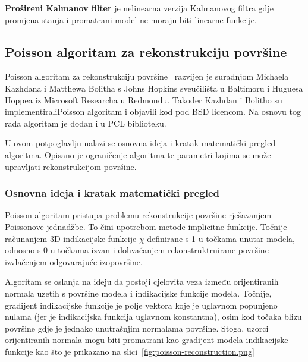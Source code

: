\textbf{Prošireni Kalmanov filter} je nelinearna verzija Kalmanovog
filtra gdje promjena stanja i promatrani model ne moraju biti linearne
funkcije.



\newpage
\subsection{Poisson algoritam za rekonstrukciju površine} %
\label{sub:Poisson}
Poisson algoritam za rekonstrukciju površine~\cite{Kazhdan:2006}
razvijen je suradnjom Michaela Kazhdana i Matthewa Bolitha s Johns
Hopkins sveučilišta u Baltimoru i Huguesa Hoppea iz Microsoft Researcha
u Redmondu. Također Kazhdan i Bolitho su implementirali\footnotemark[1]
Poisson algoritam i objavili kod pod BSD licencom. Na osnovu tog rada
algoritam je dodan i u PCL biblioteku.

U ovom potpoglavlju nalazi se osnovna ideja i kratak matematički pregled
algoritma. Opisano je ograničenje algoritma te parametri kojima se može
upravljati rekonstrukcijom površine.



\subsubsection{Osnovna ideja i kratak matematički pregled} %
\label{ssub:Osnovna ideja i kratak matematički pregled}

Poisson algoritam pristupa problemu rekonstrukcije površine rješavanjem
Poissonove jednadžbe. To čini upotrebom metode implicitne funkcije.
Točnije računanjem 3D indikacijske funkcije \(\chi\) definirane s 1 u
točkama unutar modela, odnosno s 0 u točkama izvan i dohvaćanjem
rekonstruktruirane površine izvlačenjem odgovarajuće izopovršine.

Algoritam se oslanja na ideju da postoji cjelovita veza između
orijentiranih normala uzetih s površine modela i indikacijske funkcije
modela. Točnije, gradijent indikacijske funkcije je polje vektora koje
je uglavnom popunjeno nulama (jer je indikacijska funkcija uglavnom
konstantna), osim kod točaka blizu površine gdje je jednako unutrašnjim
normalama površine. Stoga, uzorci orijentiranih normala mogu biti
promatrani kao gradijent modela indikacijske funkcije kao što je
prikazano na slici~\ref{fig:poisson-reconstruction.png}

